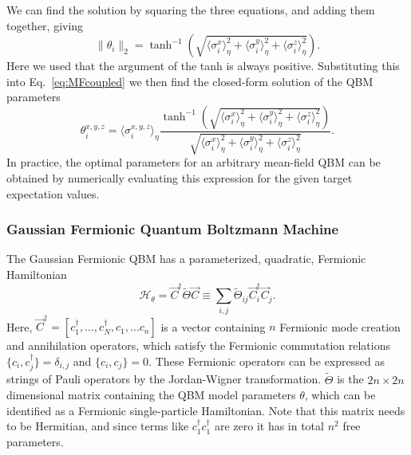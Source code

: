 \documentclass[
    aps,
    prx,
    floatfix,
    nofootinbib,
    onecolumn
]{revtex4-2}
\begin{document}
We can find the solution by squaring the three equations, and adding them together, giving
\begin{equation}
    \| \theta_i \|_2 = \tanh^{-1} \left(  \sqrt{\langle \sigma_i^{x}\rangle_\eta^2 + \langle \sigma_i^{y}\rangle_\eta^2 + \langle \sigma_i^{z}\rangle_\eta^2  } \right).
\end{equation}
Here we used that the argument of the tanh is always positive. Substituting this into Eq.~\eqref{eq:MFcoupled} we then find the closed-form solution of the QBM parameters
\begin{equation}
\theta_i^{x,y,z} = \langle \sigma_i^{x,y,z}\rangle_\eta \frac{ \tanh^{-1} \left( \sqrt{\langle \sigma_i^{x}\rangle_\eta^2 + \langle \sigma_i^{y}\rangle_\eta^2 + \langle \sigma_i^{z}\rangle_\eta^2  } \right) }{ \sqrt{\langle \sigma_i^{x}\rangle_\eta^2 + \langle \sigma_i^{y}\rangle_\eta^2 + \langle \sigma_i^{z}\rangle_\eta^2  } }.
\end{equation} 
In practice, the optimal parameters for an arbitrary mean-field QBM can be obtained by numerically evaluating this expression for the given target expectation values. 

\subsubsection{Gaussian Fermionic Quantum Boltzmann Machine}

The Gaussian Fermionic QBM has a parameterized, quadratic, Fermionic Hamiltonian
\begin{equation}
    \mathcal{H}_\theta = \vec{C}^\dagger \tilde{\Theta} \vec{C} \equiv \sum_{i,j}\tilde{\Theta}_{ij} \vec{C}^\dagger_i \vec{C}_j.
\end{equation}
Here, $\vec{C}^\dagger = [c_1^\dagger, \dots, c_N^\dagger, c_1, \dots c_n ]$ is a vector containing $n$ Fermionic mode creation and annihilation operators, which satisfy the Fermionic commutation relations $\{c_i, c_j^\dagger\}=\delta_{i,j}$ and $\{c_i, c_j\}=0$. These Fermionic operators can be expressed as strings of Pauli operators by the Jordan-Wigner transformation. $\tilde{\Theta}$ is the  $2n\times 2n$ dimensional matrix containing the QBM model parameters $\theta$, which can be identified as a Fermionic single-particle Hamiltonian. Note that this matrix needs to be Hermitian, and since terms like $c^\dagger_1 c^\dagger_1$ are zero it has in total $n^2$ free parameters. 
\end{document}

